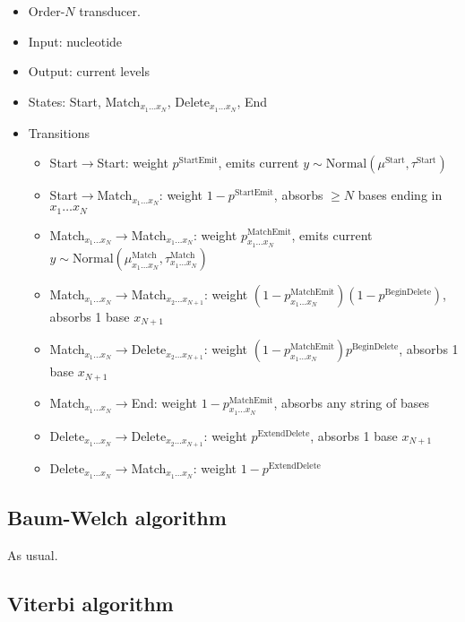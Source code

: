 \documentclass[10pt]{article}
\begin{document}
\begin{itemize}
\item Order-$N$ transducer.
\item Input: nucleotide
\item Output: current levels
\item States: Start, Match${}_{x_1 \ldots x_N}$, Delete${}_{x_1 \ldots x_N}$, End
\item Transitions
\begin{itemize}
\item Start$\to$Start: weight $p^{\mbox{StartEmit}}$, emits current $y \sim \mbox{Normal}(\mu^{\mbox{Start}},\tau^{\mbox{Start}})$
\item Start$\to$Match${}_{x_1 \ldots x_N}$: weight $1 - p^{\mbox{StartEmit}}$, absorbs $\geq N$ bases ending in $x_1 \ldots x_N$
\item Match${}_{x_1 \ldots x_N}\to$Match${}_{x_1 \ldots x_N}$: weight ${p^{\mbox{MatchEmit}}_{x_1\ldots x_N}}$, emits current $y \sim \mbox{Normal}(\mu^{\mbox{Match}}_{x_1\ldots x_N},\tau^{\mbox{Match}}_{x_1\ldots x_N})$
\item Match${}_{x_1 \ldots x_N}\to$Match${}_{x_2 \ldots x_{N+1}}$: weight $(1 - {p^{\mbox{MatchEmit}}_{x_1\ldots x_N}})(1 - p^{\mbox{BeginDelete}})$, absorbs 1 base $x_{N+1}$
\item Match${}_{x_1 \ldots x_N}\to$Delete${}_{x_2 \ldots x_{N+1}}$: weight $(1 - {p^{\mbox{MatchEmit}}_{x_1\ldots x_N}}) p^{\mbox{BeginDelete}}$, absorbs 1 base $x_{N+1}$
\item Match${}_{x_1 \ldots x_N}\to$End: weight $1 - {p^{\mbox{MatchEmit}}_{x_1\ldots x_N}}$, absorbs any string of bases
\item Delete${}_{x_1 \ldots x_N}\to$Delete${}_{x_2 \ldots x_{N+1}}$: weight $p^{\mbox{ExtendDelete}}$, absorbs 1 base $x_{N+1}$
\item Delete${}_{x_1 \ldots x_N}\to$Match${}_{x_1 \ldots x_N}$: weight $1 - p^{\mbox{ExtendDelete}}$
\end{itemize}
\end{itemize}




\subsection{Baum-Welch algorithm}

As usual.

\subsection{Viterbi algorithm}
\end{document}
